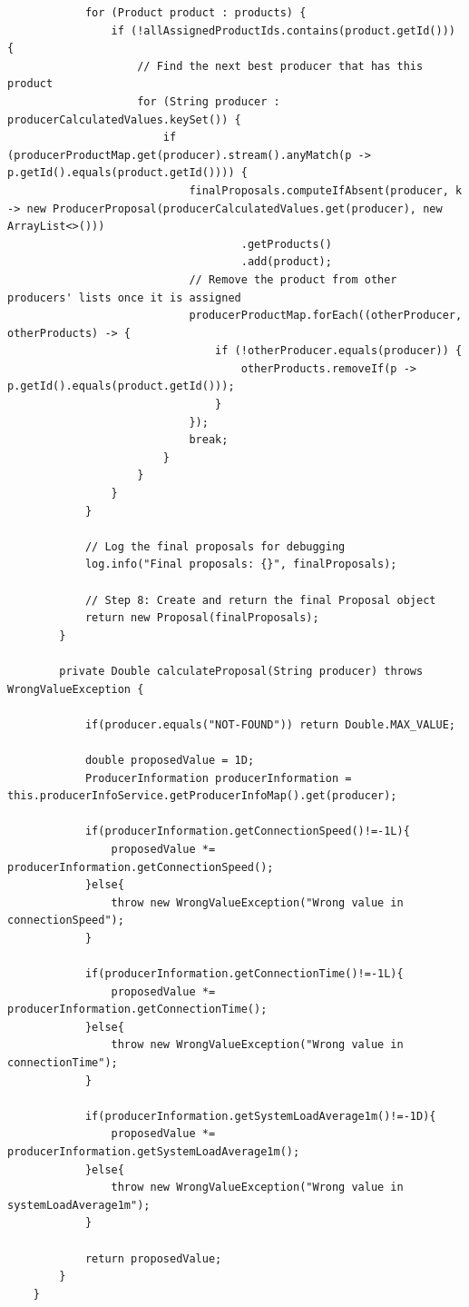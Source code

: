 \begin{lstlisting}
            for (Product product : products) {
                if (!allAssignedProductIds.contains(product.getId())) {
                    // Find the next best producer that has this product
                    for (String producer : producerCalculatedValues.keySet()) {
                        if (producerProductMap.get(producer).stream().anyMatch(p -> p.getId().equals(product.getId()))) {
                            finalProposals.computeIfAbsent(producer, k -> new ProducerProposal(producerCalculatedValues.get(producer), new ArrayList<>()))
                                    .getProducts()
                                    .add(product);
                            // Remove the product from other producers' lists once it is assigned
                            producerProductMap.forEach((otherProducer, otherProducts) -> {
                                if (!otherProducer.equals(producer)) {
                                    otherProducts.removeIf(p -> p.getId().equals(product.getId()));
                                }
                            });
                            break;
                        }
                    }
                }
            }
    
            // Log the final proposals for debugging
            log.info("Final proposals: {}", finalProposals);
    
            // Step 8: Create and return the final Proposal object
            return new Proposal(finalProposals);
        }
    
        private Double calculateProposal(String producer) throws WrongValueException {
    
            if(producer.equals("NOT-FOUND")) return Double.MAX_VALUE;
    
            double proposedValue = 1D;
            ProducerInformation producerInformation = this.producerInfoService.getProducerInfoMap().get(producer);
    
            if(producerInformation.getConnectionSpeed()!=-1L){
                proposedValue *= producerInformation.getConnectionSpeed();
            }else{
                throw new WrongValueException("Wrong value in connectionSpeed");
            }
    
            if(producerInformation.getConnectionTime()!=-1L){
                proposedValue *= producerInformation.getConnectionTime();
            }else{
                throw new WrongValueException("Wrong value in connectionTime");
            }
    
            if(producerInformation.getSystemLoadAverage1m()!=-1D){
                proposedValue *= producerInformation.getSystemLoadAverage1m();
            }else{
                throw new WrongValueException("Wrong value in systemLoadAverage1m");
            }
    
            return proposedValue;
        }
    }
    
\end{lstlisting}


